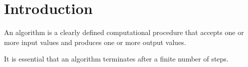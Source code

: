 \section{Introduction}

\begin{definition}
    An algorithm is a clearly defined computational procedure that accepts one or more input values and produces one or more output values.
\end{definition}
It is essential that an algorithm terminates after a finite number of steps.